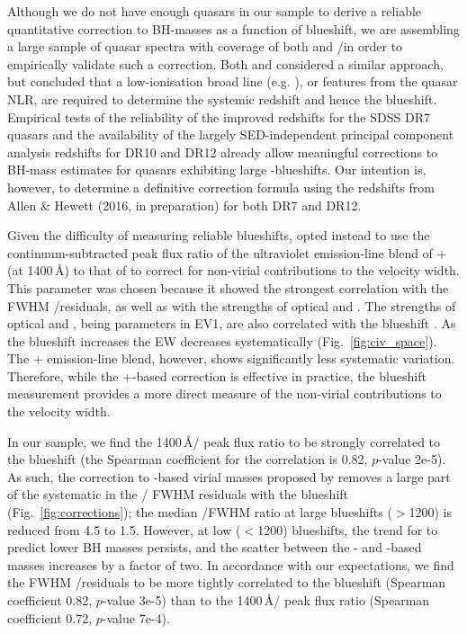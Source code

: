 Although we do not have enough quasars in our sample to derive a reliable quantitative correction to BH-masses as a function of  blueshift, we are assembling a large sample of quasar spectra with coverage of both  and \hbns/\ha in order to empirically validate such a correction. 
Both \citet{runnoe13} and \citet{shen12} considered a similar approach, but concluded that a low-ionisation broad line (e.g. ), or features from the quasar NLR, are required to determine the systemic redshift and hence the  blueshift. 
Empirical tests of the reliability of the improved \citet{hewett10} redshifts for the SDSS DR7 quasars \citep{shen16b} and the availability of the largely SED-independent principal component analysis redshifts for DR10 and DR12 \citep{paris14, paris17} already allow meaningful corrections to BH-mass estimates for quasars exhibiting large -blueshifts.
Our intention is, however, to determine a definitive correction formula using the redshifts from Allen \& Hewett (2016, in preparation) for both DR7 and DR12.

Given the difficulty of measuring reliable  blueshifts, \citet{runnoe13} opted instead to use the continuum-subtracted peak flux ratio of the ultraviolet emission-line blend of + (at 1400\,\AA) to that of  to correct for non-virial contributions to the  velocity width. 
This parameter was chosen because it showed the strongest correlation with the FWHM /\hb residuals, as well as with the strengths of optical  and . 
The strengths of optical  and , being parameters in EV1, are also correlated with the  blueshift \citep{sulentic07}. 
As the  blueshift increases the EW decreases systematically (Fig.~\ref{fig:civ_space}).
The + emission-line blend, however, shows significantly less systematic variation. 
Therefore, while the \citet{runnoe13} +-based correction is effective in practice, the  blueshift measurement provides a more direct measure of the non-virial contributions to the  velocity width.

In our sample, we find the 1400\,\AA/ peak flux ratio to be strongly correlated to the  blueshift (the Spearman coefficient for the correlation is 0.82, $p$-value 2{\sc e}-5).
As such, the correction to -based virial masses proposed by \citet[][their equation 3]{runnoe13} removes a large part of the systematic in the \hans/ FWHM residuals with the  blueshift (Fig.~\ref{fig:corrections}); the median /\ha FWHM ratio at large  blueshifts ($>$1200\kms) is reduced from 4.5 to 1.5.
However, at low ($<$1200\kms)  blueshifts, the trend for  to predict lower BH masses persists, and the scatter between the - and \hans-based masses increases by a factor of two.   
In accordance with our expectations, we find the FWHM /\ha residuals to be more tightly correlated to the  blueshift (Spearman coefficient 0.82, $p$-value 3{\sc e}-5) than to the 1400\,\AA/ peak flux ratio (Spearman coefficient 0.72, $p$-value 7{\sc e}-4). 

